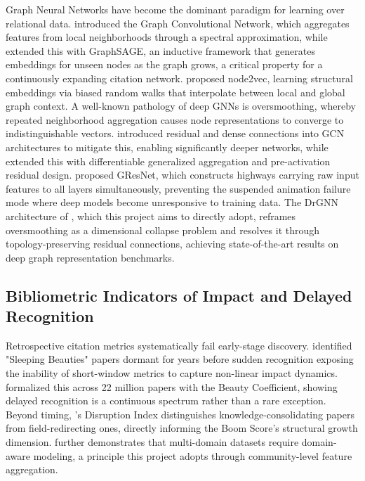 \documentclass[a4paper,12pt]{article}
\begin{document}
Graph Neural Networks have become the dominant paradigm for learning over relational data. \parencite{kipf_semi-supervised_2016} introduced the Graph Convolutional Network, which aggregates features from local neighborhoods through a spectral approximation, while \parencite{hamilton_inductive_2017} extended this with GraphSAGE, an inductive framework that generates embeddings for unseen nodes as the graph grows, a critical property for a continuously expanding citation network. \parencite{grover_node2vec_2016} proposed node2vec, learning structural embeddings via biased random walks that interpolate between local and global graph context. A well-known pathology of deep GNNs is oversmoothing, whereby repeated neighborhood aggregation causes node representations to converge to indistinguishable vectors. \parencite{li_deepgcns_2019} introduced residual and dense connections into GCN architectures to mitigate this, enabling significantly deeper networks, while \parencite{li_deepergcn_2020} extended this with differentiable generalized aggregation and pre-activation residual design. \parencite{zhang_gresnet_2019} proposed GResNet, which constructs highways carrying raw input features to all layers simultaneously, preventing the suspended animation failure mode where deep models become unresponsive to training data. The DrGNN architecture of \parencite{zheng_drgnn_2024}, which this project aims to directly adopt, reframes oversmoothing as a dimensional collapse problem and resolves it through topology-preserving residual connections, achieving state-of-the-art results on deep graph representation benchmarks.

\subsection{Bibliometric Indicators of Impact and Delayed Recognition}

Retrospective citation metrics systematically fail early-stage discovery. \parencite{van_raan_sleeping_2004} identified "Sleeping Beauties" papers dormant for years before sudden recognition exposing the inability of short-window metrics to capture non-linear impact dynamics. \parencite{ke_defining_2015} formalized this across 22 million papers with the Beauty Coefficient, showing delayed recognition is a continuous spectrum rather than a rare exception. Beyond timing, \parencite{patel_characterizing_2022}'s Disruption Index distinguishes knowledge-consolidating papers from field-redirecting ones, directly informing the Boom Score's structural growth dimension. \parencite{zhang_predicting_2024} further demonstrates that multi-domain datasets require domain-aware modeling, a principle this project adopts through community-level feature aggregation.
\end{document}
